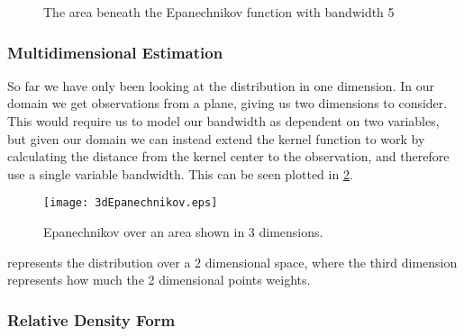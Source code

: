 \begin{figure}
\centering
{}
\caption{The area beneath the Epanechnikov function with bandwidth 5}
\label{fig:1dEpanechnikovDistributionWithHPlot}
\end{figure}

\subsubsection{Multidimensional Estimation}

So far we have only been looking at the distribution in one dimension. In our domain we get observations from a plane, giving us two dimensions to consider. This would require us to model our bandwidth as dependent on two variables, but given our domain we can instead extend the kernel function to work by calculating the distance from the kernel center to the observation, and therefore use a single variable bandwidth. This can be seen plotted in \cref{fig:3dEpanechnikov}.

\begin{figure}[htbp]
\centering
    \texttt{[image: 3dEpanechnikov.eps]}
    \caption{Epanechnikov over an area shown in 3 dimensions.}
    \label{fig:3dEpanechnikov}
\end{figure}

 represents the distribution over a 2 dimensional space, where the third dimension represents how much the 2 dimensional points weights.

\subsubsection{Relative Density Form}

